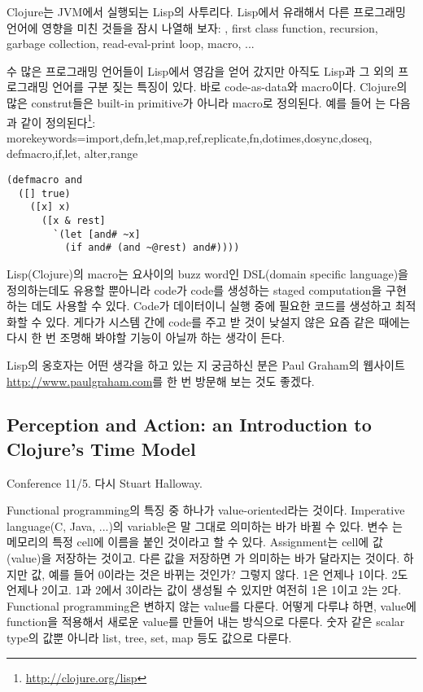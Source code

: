 \documentclass[11pt]{article}
\begin{document}
Clojure는 JVM에서 실행되는 Lisp의 사투리다. Lisp에서 유래해서 다른 
프로그래밍 언어에 영향을 미친 것들을 잠시 나열해 보자: ,
first class function, recursion, garbage collection, read-eval-print loop, 
macro, ...

수 많은 프로그래밍 언어들이 Lisp에서 영감을 얻어 갔지만 아직도 Lisp과 그 외의
프로그래밍 언어를 구분 짖는 특징이 있다. 바로 code-as-data와 macro이다.
Clojure의 많은 construt들은 built-in primitive가 아니라 macro로 정의된다.
예를 들어 는 다음과 같이 
정의된다\footnote{\url{http://clojure.org/lisp}}:
    {morekeywords={import,defn,let,map,ref,replicate,fn,dotimes,dosync,doseq,
                   defmacro,if,let, alter,range}
    }
\begin{lstlisting}
(defmacro and
  ([] true)
    ([x] x)
      ([x & rest]
        `(let [and# ~x]
          (if and# (and ~@rest) and#))))
\end{lstlisting}
Lisp(Clojure)의 macro는 요사이의 buzz word인 DSL(domain specific language)을 
정의하는데도 유용할 뿐아니라 code가 code를 생성하는 staged computation을 
구현하는 데도 사용할 수 있다. Code가 데이터이니 실행 중에 필요한 코드를 
생성하고 최적화할 수 있다. 게다가 시스템 간에 code를 주고 받 것이 낮설지 않은 
요즘 같은 때에는 다시 한 번 조명해 봐야할 기능이 아닐까 하는 생각이 든다.

Lisp의 옹호자는 어떤 생각을 하고 있는 지 궁금하신 분은 Paul Graham의
웹사이트 \url{http://www.paulgraham.com}를 한 번 방문해 보는 것도 좋겠다.

\subsection{Perception and Action: an Introduction to Clojure's Time Model}

Conference 11/5. 다시 Stuart Halloway.
 
 
Functional programming의 특징 중 하나가 value-oriented라는
것이다. Imperative language(C, Java, ...)의 variable은 말 그대로 의미하는 바가
바뀔 수 있다. 변수 는 메모리의 특정 cell에 이름을 붙인 것이라고 할 수 
있다. Assignment는 cell에 값(value)을 저장하는 것이고. 다른 값을 저장하면 
가 의미하는 바가 달라지는 것이다. 하지만 값, 예를 들어 0이라는 것은 
바뀌는 것인가? 그렇지 않다. 1은 언제나 1이다. 2도 언제나 2이고. 1과 2에서 
3이라는 값이 생성될 수 있지만 여전히 1은 1이고 2는 2다.
Functional programming은 변하지 않는 value를 다룬다. 어떻게 다루냐 하면, 
value에 function을 적용해서 새로운 value를 만들어 내는 방식으로 다룬다.
숫자 같은 scalar type의 값뿐 아니라 list, tree, set, map 등도 값으로 다룬다.
\end{document}
